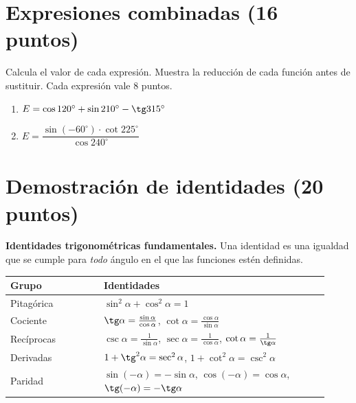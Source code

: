 \documentclass[12pt, letterpaper]{article}
\providecommand{\sen}{\sin}
\begin{document}
\section{Expresiones combinadas (16 puntos)}

\begin{cuadroinfo}
  \small
  Calcula el valor de cada expresión. Muestra la reducción de cada función
  antes de sustituir. Cada expresión vale 8 puntos.
\end{cuadroinfo}

\begin{enumerate}[leftmargin=*, label=\textbf{\arabic*.}, itemsep=1.5em]
  \item $E=\cos 120^\circ+\sen 210^\circ-\tg 315^\circ$
        \vspace{4em}

  \item $E=\dfrac{\sen(-60^\circ)\cdot\cot 225^\circ}{\cos 240^\circ}$
        \vspace{4em}
\end{enumerate}

\newpage
\section{Demostración de identidades (20 puntos)}

\begin{cuadroteoria}
  \small
  \textbf{Identidades trigonométricas fundamentales.} Una identidad es una
  igualdad que se cumple para \emph{todo} ángulo en el que las funciones estén
  definidas.
  \begin{center}
  \renewcommand{\arraystretch}{1.25}
  \begin{tabular}{@{}p{0.27\linewidth}p{0.65\linewidth}@{}}
    \toprule
    \textbf{Grupo} & \textbf{Identidades} \\
    \midrule
    Pitagórica & $\sen^{2}\alpha+\cos^{2}\alpha=1$ \\[2pt]
    Cociente & $\tg\alpha=\frac{\sen\alpha}{\cos\alpha}$, \quad
               $\cot\alpha=\frac{\cos\alpha}{\sen\alpha}$ \\[2pt]
    Recíprocas & $\csc\alpha=\frac{1}{\sen\alpha}$, \quad
                 $\sec\alpha=\frac{1}{\cos\alpha}$, \quad
                 $\cot\alpha=\frac{1}{\tg\alpha}$ \\[2pt]
    Derivadas & $1+\tg^{2}\alpha=\sec^{2}\alpha$, \quad
                $1+\cot^{2}\alpha=\csc^{2}\alpha$ \\[2pt]
    Paridad & $\sen(-\alpha)=-\sen\alpha$, \quad
              $\cos(-\alpha)=\cos\alpha$, \quad
              $\tg(-\alpha)=-\tg\alpha$ \\
    \bottomrule
  \end{tabular}
  \end{center}
\end{cuadroteoria}
\end{document}
